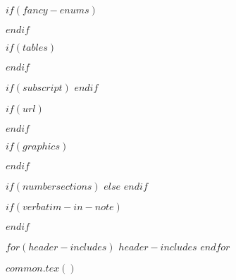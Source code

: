 
\usepackage[flushmargin]{footmisc-2011-06-06}

\setlength{\parindent}{0pt}
\setlength{\parskip}{6pt plus 2pt minus 1pt}

$if(fancy-enums)$
\makeatletter\AtBeginDocument{%
  \renewcommand{\@listi}
    {\setlength{\labelwidth}{4em}}
}\makeatother
\usepackage{enumerate}
$endif$

$if(tables)$
\usepackage{array}
\newcommand{\PreserveBackslash}[1]{\let\temp=\\#1\let\\=\temp}
\let\PBS=\PreserveBackslash
$endif$

$if(subscript)$
\newcommand{\textsubscr}[1]{\ensuremath{_{\scriptsize\textrm{#1}}}}
$endif$

\usepackage[breaklinks=true]{hyperref}
\hypersetup{colorlinks,%
citecolor=blue,%
filecolor=blue,%
linkcolor=blue,%
urlcolor=blue}
$if(url)$
\usepackage{url}
$endif$

$if(graphics)$
\usepackage{graphicx}
\makeatletter
\def\maxwidth{\ifdim\Gin@nat@width>\linewidth\linewidth
\else\Gin@nat@width\fi}
\makeatother
\let\Oldincludegraphics\includegraphics
\renewcommand{\includegraphics}[1]{\Oldincludegraphics[width=\maxwidth]{#1}}
$endif$

$if(numbersections)$
$else$
\setcounter{secnumdepth}{0}
$endif$

$if(verbatim-in-note)$
\usepackage{fancyvrb}
\VerbatimFootnotes
$endif$

$for(header-includes)$
$header-includes$
$endfor$

$common.tex()$
